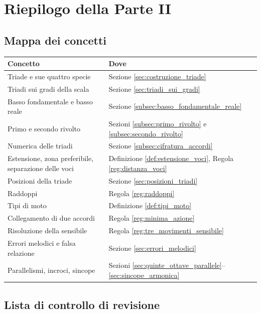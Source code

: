 \chapter{Riepilogo della Parte II}
\label{chap:riepilogo_ii}

\section{Mappa dei concetti}
\label{sec:mappa_ii}

\begin{center}
\small
\begin{tabular}{p{5.2cm}p{6.8cm}}
\toprule
\textbf{Concetto} & \textbf{Dove} \\
\midrule
Triade e sue quattro specie & Sezione \ref{sec:costruzione_triade} \\
Triadi sui gradi della scala & Sezione \ref{sec:triadi_sui_gradi} \\
Basso fondamentale e basso reale & Sezione \ref{subsec:basso_fondamentale_reale} \\
Primo e secondo rivolto & Sezioni \ref{subsec:primo_rivolto} e \ref{subsec:secondo_rivolto} \\
Numerica delle triadi & Sezione \ref{subsec:cifratura_accordi} \\
Estensione, zona preferibile, separazione delle voci & Definizione \ref{def:estensione_voci}, Regola \ref{reg:distanza_voci} \\
Posizioni della triade & Sezione \ref{sec:posizioni_triadi} \\
Raddoppi & Regola \ref{reg:raddoppi} \\
Tipi di moto & Definizione \ref{def:tipi_moto} \\
Collegamento di due accordi & Regola \ref{reg:minima_azione} \\
Risoluzione della sensibile & Regola \ref{reg:tre_movimenti_sensibile} \\
Errori melodici e falsa relazione & Sezione \ref{sec:errori_melodici} \\
Parallelismi, incroci, sincope & Sezioni \ref{sec:quinte_ottave_parallele}--\ref{sec:sincope_armonica} \\
\bottomrule
\end{tabular}
\end{center}

\section{Lista di controllo di revisione}
\label{sec:checklist}

